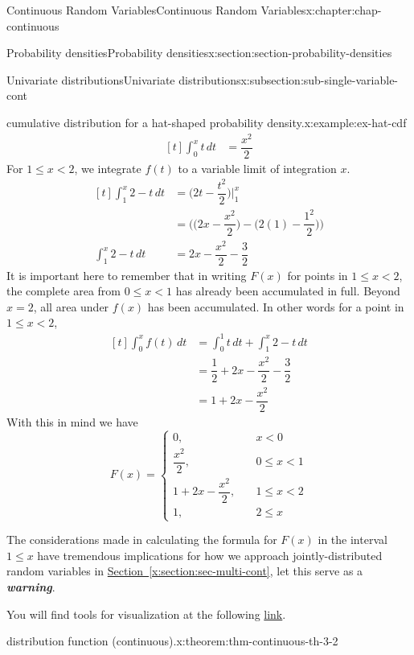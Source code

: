 \documentclass[oneside,10pt,]{book}
\newcommand{\xreffont}{\relax}
\newcommand{\alert}[1]{\textbf{\textit{#1}}}
\numberwithin{equation}{section}
\newcommand{\lt}{<}
\newcommand{\amp}{&}
\begin{document}
\begin{chapterptx}{Continuous Random Variables}{}{Continuous Random Variables}{}{}{x:chapter:chap-continuous}
\begin{sectionptx}{Probability densities}{}{Probability densities}{}{}{x:section:section-probability-densities}
\begin{subsectionptx}{Univariate distributions}{}{Univariate distributions}{}{}{x:subsection:sub-single-variable-cont}
\begin{example}{cumulative distribution for a hat-shaped probability density.}{x:example:ex-hat-cdf}
\begin{equation*}
\begin{aligned}[t]
\int_0^x t\,dt \amp = \dfrac{x^2}{2}
\end{aligned}
\end{equation*}
For \(1 \le x \lt 2\), we integrate \(f(t)\) to a variable limit of integration \(x\).%
\begin{equation*}
\begin{aligned}[t]
\int_1^x 2-t\,dt \amp = \Big(2t-\dfrac{t^2}{2}\Big)\Big|_1^x\\
\amp = \Big(\Big(2x - \dfrac{x^2}{2}\Big) - \Big(2(1) -
\dfrac{1^2}{2}\Big)\Big)\\
\int_1^x 2-t\,dt \amp = 2x - \dfrac{x^2}{2} - \dfrac{3}{2}
\end{aligned}
\end{equation*}
It is important here to remember that in writing \(F(x)\) for points in \(1 \le x \lt 2\), the complete area from \(0 \le x \lt 1\) has already been accumulated in full. Beyond \(x = 2\), all area under \(f(x)\) has been accumulated. In other words for a point in \(1 \le x \lt 2\),%
\begin{equation*}
\begin{aligned}[t] 
\int_0^x f(t)\,dt \amp = \int_0^1 t\,dt + \int_1^x 2-t\,dt\\
\amp = \dfrac{1}{2} + 2x - \dfrac{x^2}{2} - \dfrac{3}{2}\\
\amp = 1 + 2x - \dfrac{x^2}{2}
\end{aligned}
\end{equation*}
With this in mind we have%
\begin{equation*}
F(x) = \begin{cases}
0,\amp \quad x \lt 0\\
\dfrac{x^2}{2}, \amp \quad 0 \le x \lt 1\\
1 + 2x - \dfrac{x^2}{2}, \amp \quad 1 \le x
\lt 2\\
1, \amp \quad 2 \le x
\end{cases}
\end{equation*}
%
\end{example}
The considerations made in calculating the formula for \(F(x)\) in the interval \(1 \le x\) have tremendous implications for how we approach jointly-distributed random variables in \hyperref[x:section:sec-multi-cont]{Section~{\xreffont\ref{x:section:sec-multi-cont}}}, let this serve as a \alert{warning}.%
\par
You will find tools for visualization at the following \href{https://buddy.uco.edu/shiny/slaverty/mathstat/pdf_cdf/}{link}.%
\begin{theorem}{distribution function (continuous).}{}{x:theorem:thm-continuous-th-3-2}%

\end{theorem}
\end{subsectionptx}
\end{sectionptx}
\end{chapterptx}
\end{document}
